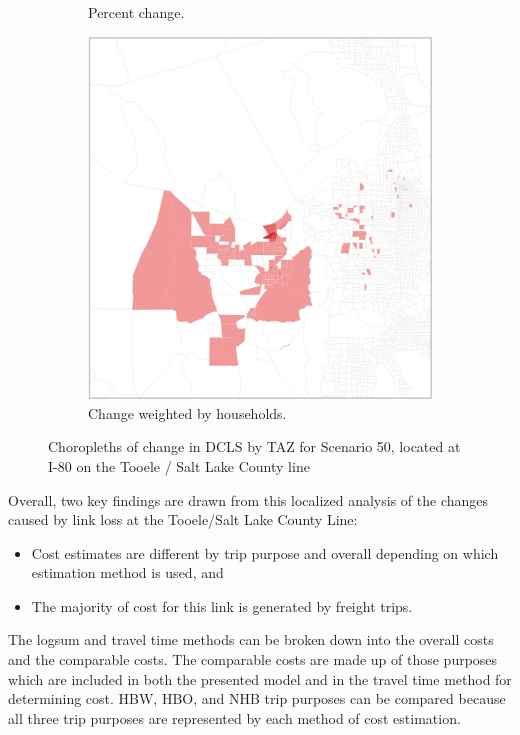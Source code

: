 \begin{landscape}
\begin{figure}
\begin{subfigure}[b]{0.45\textwidth}
         \caption{Percent change.}
         \label{fig:percentchangemap}
     \end{subfigure}
     \hfill
     \begin{subfigure}[b]{0.44\textwidth}
         \centering
         \includegraphics[width=\textwidth]{figures/chapter4/populationweightedchangechoropleth.png}
         \caption{Change weighted by households.}
         \label{fig:hhmap}
     \end{subfigure}
        \caption{Choropleths of change in DCLS by TAZ for Scenario 50, located at I-80 on the Tooele / Salt Lake County line}
        \label{fig:three_charts}
\end{figure}
\end{landscape}

Overall, two key findings are drawn from this localized analysis of the changes caused by link loss at the Tooele/Salt Lake County Line:
\begin{itemize}
  \item {Cost estimates are different by trip purpose and overall depending on
  which estimation method is used, and}
  \item {The majority of cost for this link is generated by freight trips.}
\end{itemize}
The logsum and travel time methods can be broken down into the overall costs and the
comparable costs. The comparable costs are made up of those purposes which are
included in both the presented model and in the travel time method for determining
cost. HBW, HBO, and NHB trip purposes can be compared because all three trip purposes
are represented by each method of cost estimation.

